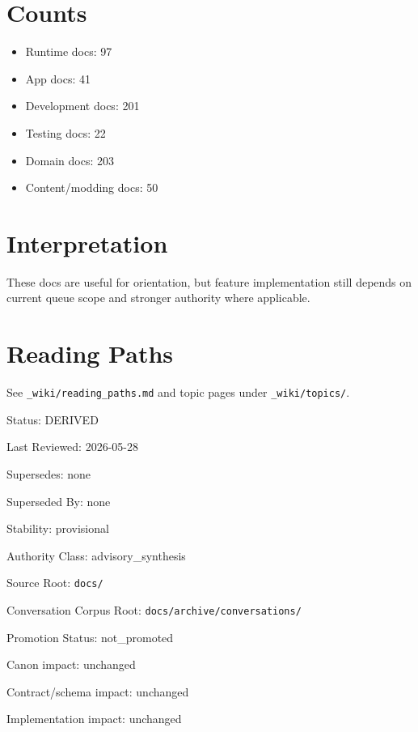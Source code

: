\documentclass[10.5pt,a4paper]{book}
\begin{document}
\chapter{Counts}

\begin{itemize}
\item Runtime docs: 97
\item App docs: 41
\item Development docs: 201
\item Testing docs: 22
\item Domain docs: 203
\item Content/\allowbreak{}modding docs: 50
\end{itemize}

\chapter{Interpretation}

These docs are useful for orientation, but feature implementation still depends on current queue scope and stronger authority where applicable.\allowbreak{}


\chapter{Reading Paths}

See \texttt{\_\allowbreak{}wiki/\allowbreak{}reading\_\allowbreak{}paths.\allowbreak{}md} and topic pages under \texttt{\_\allowbreak{}wiki/\allowbreak{}topics/\allowbreak{}}.\allowbreak{}



Status: DERIVED

Last Reviewed: 2026-\allowbreak{}05-\allowbreak{}28

Supersedes: none

Superseded By: none

Stability: provisional

Authority Class: advisory\_\allowbreak{}synthesis

Source Root: \texttt{docs/\allowbreak{}}

Conversation Corpus Root: \texttt{docs/\allowbreak{}archive/\allowbreak{}conversations/\allowbreak{}}

Promotion Status: not\_\allowbreak{}promoted

Canon impact: unchanged

Contract/\allowbreak{}schema impact: unchanged

Implementation impact: unchanged
\end{document}
